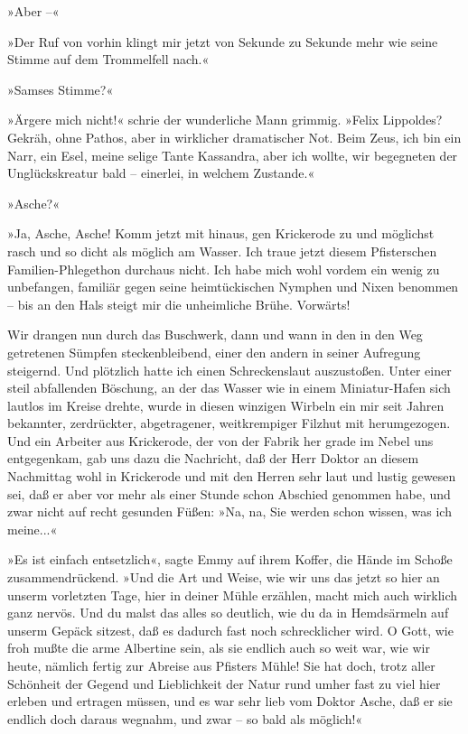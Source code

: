 »Aber –«

»Der Ruf von vorhin klingt mir jetzt von Sekunde zu Sekunde mehr
wie seine Stimme auf dem Trommelfell nach.«

»Samses Stimme?«

»Ärgere mich nicht!« schrie der wunderliche Mann grimmig. »Felix
Lippoldes? Gekräh, ohne Pathos, aber in wirklicher dramatischer
Not. Beim Zeus, ich bin ein Narr, ein Esel, meine selige Tante
Kassandra, aber ich wollte, wir begegneten der Unglückskreatur bald
– einerlei, in welchem Zustande.«

»Asche?«

»Ja, Asche, Asche! Komm jetzt mit hinaus, gen Krickerode zu und
möglichst rasch und so dicht als möglich am Wasser. Ich traue jetzt
diesem Pfisterschen Familien-Phlegethon durchaus nicht. Ich habe
mich wohl vordem ein wenig zu unbefangen, familiär gegen seine
heimtückischen Nymphen und Nixen benommen – bis an den Hals steigt
mir die unheimliche Brühe. Vorwärts!

Wir drangen nun durch das Buschwerk, dann und wann in den in den
Weg getretenen Sümpfen steckenbleibend, einer den andern in seiner
Aufregung steigernd. Und plötzlich hatte ich einen Schreckenslaut
auszustoßen. Unter einer steil abfallenden Böschung, an der das
Wasser wie in einem Miniatur-Hafen sich lautlos im Kreise drehte,
wurde in diesen winzigen Wirbeln ein mir seit Jahren bekannter,
zerdrückter, abgetragener, weitkrempiger Filzhut mit herumgezogen.
Und ein Arbeiter aus Krickerode, der von der Fabrik her grade im
Nebel uns entgegenkam, gab uns dazu die Nachricht, daß der Herr
Doktor an diesem Nachmittag wohl in Krickerode und mit den Herren
sehr laut und lustig gewesen sei, daß er aber vor mehr als einer
Stunde schon Abschied genommen habe, und zwar nicht auf recht
gesunden Füßen: »Na, na, Sie werden schon wissen, was ich
meine...«

»Es ist einfach entsetzlich«, sagte Emmy auf ihrem Koffer, die
Hände im Schoße zusammendrückend. »Und die Art und Weise, wie wir
uns das jetzt so hier an unserm vorletzten Tage, hier in deiner
Mühle erzählen, macht mich auch wirklich ganz nervös. Und du malst
das alles so deutlich, wie du da in Hemdsärmeln auf unserm Gepäck
sitzest, daß es dadurch fast noch schrecklicher wird. O Gott, wie
froh mußte die arme Albertine sein, als sie endlich auch so weit
war, wie wir heute, nämlich fertig zur Abreise aus Pfisters Mühle!
Sie hat doch, trotz aller Schönheit der Gegend und Lieblichkeit der
Natur rund umher fast zu viel hier erleben und ertragen müssen, und
es war sehr lieb vom Doktor Asche, daß er sie endlich doch daraus
wegnahm, und zwar – so bald als möglich!«

